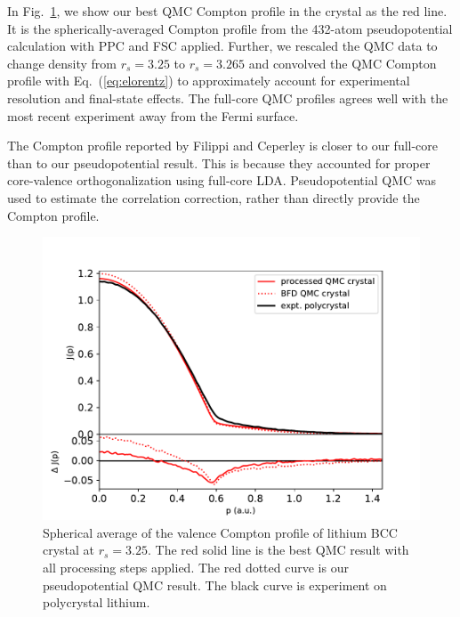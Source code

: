 \documentclass[aps,prb,showpacs,preprintnumbers,amsmath,amssymb,superscriptaddress,twocolumn]{revtex4-1}
\begin{document}
In Fig.~\ref{fig:crystal-vcp}, we show our best QMC Compton profile in the crystal as the red line. It is the spherically-averaged Compton profile from the 432-atom pseudopotential calculation with PPC and FSC applied. Further, we rescaled the QMC data to change density from $r_s=3.25$ to $r_s=3.265$ and convolved the QMC Compton profile with Eq.~(\ref{eq:elorentz}) to approximately account for experimental resolution and final-state effects. The full-core QMC profiles agrees well with the most recent experiment away from the Fermi surface.

The Compton profile reported by Filippi and Ceperley \cite{Filippi1999} is closer to our full-core than to our pseudopotential result. This is because they accounted for proper core-valence orthogonalization using full-core LDA. Pseudopotential QMC was used to estimate the correlation correction, rather than directly provide the Compton profile.

\begin{figure}
\includegraphics[width=\linewidth]{li62g_crystal-jp}
\caption{Spherical average of the valence Compton profile of lithium BCC crystal at $r_s=3.25$. The red solid line is the best QMC result with all processing steps applied. The red dotted curve is our pseudopotential QMC result. The black curve is experiment on polycrystal lithium. \label{fig:crystal-vcp}}
\end{figure}
\end{document}
